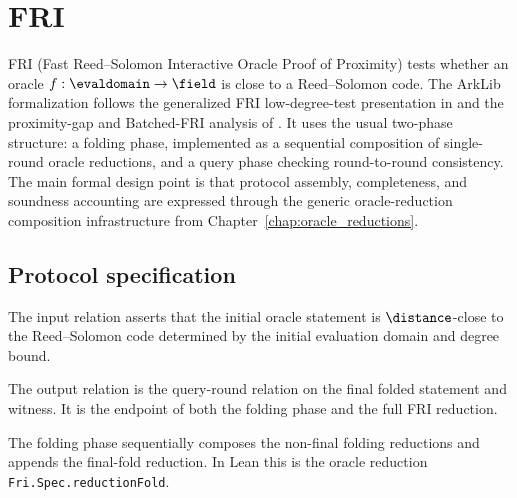 
\section{FRI}\label{sec:fri}

FRI (Fast Reed--Solomon Interactive Oracle Proof of Proximity) tests whether an oracle
$f : \evaldomain \to \field$ is close to a Reed--Solomon code.  The ArkLib formalization
follows the generalized FRI low-degree-test presentation in \cite{FRI1216} and the
proximity-gap and Batched-FRI analysis of \cite{BCIKS20}.  It uses the usual two-phase structure:
a folding phase, implemented as a sequential composition of single-round oracle reductions, and a
query phase checking round-to-round consistency.  The main formal design point is that protocol
assembly, completeness, and soundness accounting are expressed through the generic
oracle-reduction composition infrastructure from
Chapter~\ref{chap:oracle_reductions}.

\subsection{Protocol specification}\label{sec:fri_spec}

\begin{definition}\label{def:fri_input_relation}
    The input relation asserts that the initial oracle statement is $\distance$-close to the
    Reed--Solomon code determined by the initial evaluation domain and degree bound.
\end{definition}

\begin{definition}\label{def:fri_output_relation}
    The output relation is the query-round relation on the final folded statement and witness.
    It is the endpoint of both the folding phase and the full FRI reduction.
\end{definition}

\begin{definition}\label{def:fri_folding_protocol}
    The folding phase sequentially composes the non-final folding reductions and appends the
    final-fold reduction.  In Lean this is the oracle reduction
    \texttt{Fri.Spec.reductionFold}.
\end{definition}

